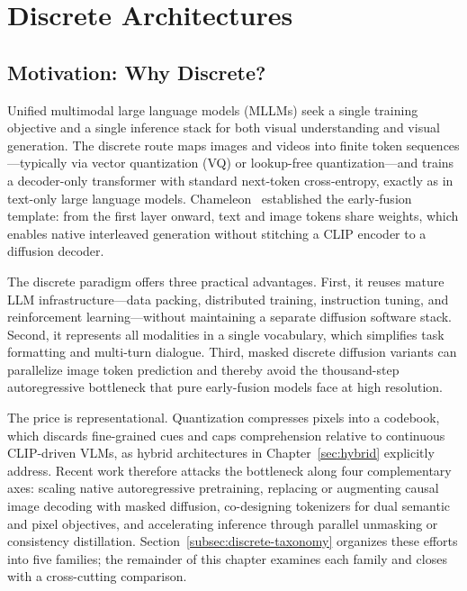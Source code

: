 
\section{Discrete Architectures}
\label{sec:discrete}

\subsection{Motivation: Why Discrete?}
\label{subsec:discrete-motivation}

Unified multimodal large language models (MLLMs) seek a single training objective and a single inference stack for both visual understanding and visual generation. The discrete route maps images and videos into finite token sequences---typically via vector quantization (VQ) or lookup-free quantization---and trains a decoder-only transformer with standard next-token cross-entropy, exactly as in text-only large language models. Chameleon~\cite{team2024chameleon} established the early-fusion template: from the first layer onward, text and image tokens share weights, which enables native interleaved generation without stitching a CLIP encoder to a diffusion decoder.

The discrete paradigm offers three practical advantages. First, it reuses mature LLM infrastructure---data packing, distributed training, instruction tuning, and reinforcement learning---without maintaining a separate diffusion software stack. Second, it represents all modalities in a single vocabulary, which simplifies task formatting and multi-turn dialogue. Third, masked discrete diffusion variants can parallelize image token prediction and thereby avoid the thousand-step autoregressive bottleneck that pure early-fusion models face at high resolution.

The price is representational. Quantization compresses pixels into a codebook, which discards fine-grained cues and caps comprehension relative to continuous CLIP-driven VLMs, as hybrid architectures in Chapter~\ref{sec:hybrid} explicitly address. Recent work therefore attacks the bottleneck along four complementary axes: scaling native autoregressive pretraining, replacing or augmenting causal image decoding with masked diffusion, co-designing tokenizers for dual semantic and pixel objectives, and accelerating inference through parallel unmasking or consistency distillation. Section~\ref{subsec:discrete-taxonomy} organizes these efforts into five families; the remainder of this chapter examines each family and closes with a cross-cutting comparison.

